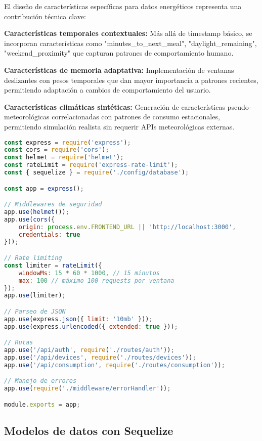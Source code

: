 El diseño de características específicas para datos energéticos representa una contribución técnica clave:

\textbf{Características temporales contextuales:} Más allá de timestamp básico, se incorporan características como "minutes_to_next_meal", "daylight_remaining", "weekend_proximity" que capturan patrones de comportamiento humano.

\textbf{Características de memoria adaptativa:} Implementación de ventanas deslizantes con pesos temporales que dan mayor importancia a patrones recientes, permitiendo adaptación a cambios de comportamiento del usuario.

\textbf{Características climáticas sintéticas:} Generación de características pseudo-meteorológicas correlacionadas con patrones de consumo estacionales, permitiendo simulación realista sin requerir APIs meteorológicas externas.

\begin{lstlisting}[language=JavaScript, caption=Configuración principal de Express]
const express = require('express');
const cors = require('cors');
const helmet = require('helmet');
const rateLimit = require('express-rate-limit');
const { sequelize } = require('./config/database');

const app = express();

// Middlewares de seguridad
app.use(helmet());
app.use(cors({
    origin: process.env.FRONTEND_URL || 'http://localhost:3000',
    credentials: true
}));

// Rate limiting
const limiter = rateLimit({
    windowMs: 15 * 60 * 1000, // 15 minutos
    max: 100 // máximo 100 requests por ventana
});
app.use(limiter);

// Parseo de JSON
app.use(express.json({ limit: '10mb' }));
app.use(express.urlencoded({ extended: true }));

// Rutas
app.use('/api/auth', require('./routes/auth'));
app.use('/api/devices', require('./routes/devices'));
app.use('/api/consumption', require('./routes/consumption'));

// Manejo de errores
app.use(require('./middleware/errorHandler'));

module.exports = app;
\end{lstlisting}

\subsection{Modelos de datos con Sequelize}

